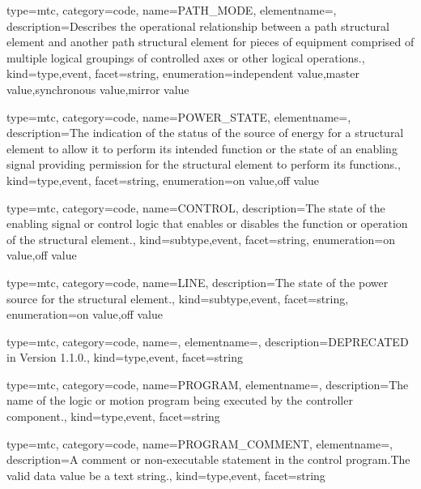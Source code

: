 {
  type=mtc,
  category=code,
  name={PATH\_MODE},
  elementname=,
  description={Describes the operational relationship between a \gls{path} \gls{structural element} and another \gls{path} \gls{structural element} for pieces of equipment comprised of multiple logical groupings of controlled axes or other logical operations.},
  kind={type,event},
  facet={\gls{string}},
  enumeration={\gls{independent value},\gls{master value},\gls{synchronous value},\gls{mirror value}}
}


{
  type=mtc,
  category=code,
  name={POWER\_STATE},
  elementname=,
  description={The indication of the status of the source of energy for a \gls{structural element} to allow it to perform its intended function or the state of an enabling signal providing permission for the \gls{structural element} to perform its functions.},
  kind={type,event},
  facet={\gls{string}},
  enumeration={\gls{on value},\gls{off value}}
}


{
  type=mtc,
  category=code,
  name={CONTROL},
  description={The state of the enabling signal or control logic that enables or disables the function or operation of the \gls{structural element}.},
  kind={subtype,event},
  facet={\gls{string}},
  enumeration={\gls{on value},\gls{off value}}
}


{
  type=mtc,
  category=code,
  name={LINE},
  description={The state of the power source for the \gls{structural element}.},
  kind={subtype,event},
  facet={\gls{string}},
  enumeration={\gls{on value},\gls{off value}}
}


{
  type=mtc,
  category=code,
  name=,
  elementname=,
  description={DEPRECATED in Version 1.1.0.},
  kind={type,event},
  facet={\gls{string}}
}


{
  type=mtc,
  category=code,
  name={PROGRAM},
  elementname=,
  description={The name of the logic or motion program being executed by the \gls{controller} component.},
  kind={type,event},
  facet={\gls{string}}
}


{
  type=mtc,
  category=code,
  name={PROGRAM\_COMMENT},
  elementname=,
  description={A comment or non-executable statement in the control program.The \gls{valid data value} \must be a text string.},
  kind={type,event},
  facet={\gls{string}}
}


